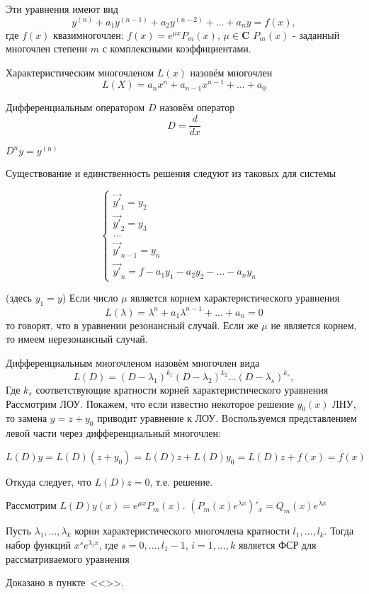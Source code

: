 \Def Эти уравнения имеют вид
\[y^{(n)}+a_1y^{(n-1)}+a_2y^{(n-2)}+...+a_n y = f(x),\]
где $f(x)$ квазимногочлен: $f(x) = e^{\mu x} P_m(x)$, $\mu \in \mathbf{C}$ $P_m(x)$ - заданный многочлен степени $m$ с комплексными коэффициентами. 

\Def Характеристическим многочленом $L(x)$ назовём многочлен
\[L(X) = a_n x^n + a_{n-1} x^{n-1} + ... + a_0\]

\Def Дифференциальным оператором $D$ назовём оператор
\[D = \frac{d}{dx}\]

\Note $D^n y = y^{(n)}$ 

Существование и единственность решения следуют из таковых для системы

\begin{equation*}
    \begin{cases}
        \vec{y'}_1 = y_2&\\
        \vec{y'}_2 = y_3&\\
        \ldots&\\
        \vec{y'}_{n-1} = y_n&\\
        \vec{y'}_n = f - a_1 y_1 - a_{2}y_2 - \ldots - a_n y_n
    \end{cases}
\end{equation*}

(здесь $y_1 = y$)
\bigbreak
\Def Если число $\mu$ является корнем характеристического уравнения 
\[L(\lambda) = \lambda^n + a_1 \lambda^{n-1}+...+ a_n = 0\]
то говорят, что в уравнении резонансный случай. Если же $\mu$ не является корнем, то имеем нерезонансный случай.

\Def Дифференциальным многочленом назовём многочлен вида 
\[L(D) = (D-\lambda_1)^{k_1} (D-\lambda_2)^{k_2} ... (D-\lambda_s)^{k_s},\]
Где $k_s$ соответствующие кратности корней характеристического уравнения
\bigbreak
Рассмотрим ЛОУ. Покажем, что если известно некоторое решение $y_0(x)$ ЛНУ, то замена $y = z + y_0$ приводит уравнение к ЛОУ. Воспользуемся представлением левой части через дифференциальный многочлен:

\[L(D)y=L(D)(z+y_0) =L(D)z + L(D) y_0 = L(D)z + f(x) = f(x)\]

Откуда следует, что $L(D)z = 0$, т.е. решение.

Рассмотрим $L(D) y(x) = e^{\mu x} P_m(x)$.
\bigbreak
\Statement $(P_m(x)e^{\lambda x})'_x = Q_m(x)e^{\lambda x}$

\begin{theorem}
Пусть $\lambda_1, ..., \lambda_k$ корни характеристического многочлена кратности $l_1, ..., l_k$. Тогда набор функций $x^s e^{\lambda_i x}$, где $s = 0,..., l_1-1$, $i = 1, ..., k$ является ФСР для рассматриваемого уравнения
\end{theorem}
Доказано в пункте~<<>>.

